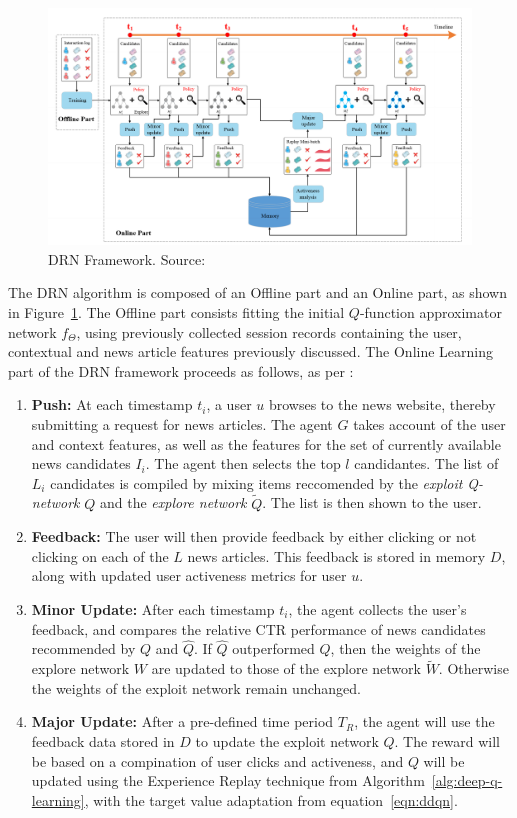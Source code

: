 \documentclass{mldsmsc}
\begin{document}
\begin{figure}[h]
    \centering
    \includegraphics[width=\textwidth]{../figures/drn.png}
    \caption{DRN Framework. Source: \citep{RefWorks:zheng2018drn:}}
    \label{fig:drn}
\end{figure}

The DRN algorithm is composed of an Offline part and an Online part, as shown in Figure~\ref{fig:drn}.
The Offline part consists fitting the initial $Q$-function approximator network $f_{\Theta}$,
using previously collected session records containing the user, contextual and news article features previously
discussed.
The Online Learning part of the DRN framework proceeds as follows, as per \citep{RefWorks:zheng2018drn:}:

\begin{enumerate}
    \item \textbf{Push:} At each timestamp $t_i$, a user $u$ browses to the news website, thereby
    submitting a request for news articles. The agent $G$ takes account of the user and context
    features, as well as the features for the set of currently available news candidates $I_i$.
    The agent then selects the top $l$ candidantes. The list of $L_i$ candidates is compiled by mixing
    items reccomended by the \emph{exploit Q-network} $Q$ and the \emph{explore network} $\tilde{Q}$.
    The list is then shown to the user.
    \item \textbf{Feedback:} The user will then provide feedback by either clicking or not clicking
    on each of the $L$ news articles. This feedback is stored in memory $D$, along with updated user
    activeness metrics for user $u$.
    \item \textbf{Minor Update:} After each timestamp $t_i$, the agent collects the user's feedback,
    and compares the relative CTR performance of news candidates recommended by $Q$ and $\hat{Q}$. 
    If $\hat{Q}$ outperformed $Q$, then the weights of the explore network $W$ are updated to those
    of the explore network $\tilde{W}$. Otherwise the weights of the exploit network remain unchanged.
    \item \textbf{Major Update:} After a pre-defined time period $T_R$, the agent will use the feedback
    data stored in $D$ to update the exploit network $Q$. The reward will be based on a compination
    of user clicks and activeness, and $Q$ will be updated using the Experience Replay technique from
    Algorithm~\ref{alg:deep-q-learning}, with the target value adaptation from equation~\ref{eqn:ddqn}.
\end{enumerate}
\end{document}
